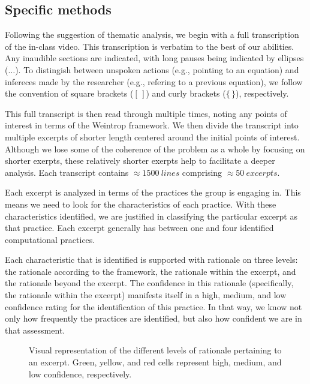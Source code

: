 \documentclass{msuphddissertation}
\begin{document}
\begin{doublespace}
\section{Specific methods}

Following the suggestion of thematic analysis, we begin with a full transcription of the in-class video.  This transcription is verbatim to the best of our abilities.  Any inaudible sections are indicated, with long pauses being indicated by ellipses ($\ldots$).  To distingish between unspoken actions (e.g., pointing to an equation) and infereces made by the researcher (e.g., refering to a previous equation), we follow the convention of square brackets ($[\,]$) and curly brackets ($\{\,\}$), respectively.

This full transcript is then read through multiple times, noting any points of interest in terms of the Weintrop framework.  We then divide the transcript into multiple excerpts of shorter length centered around the initial points of interest.  Although we lose some of the coherence of the problem as a whole by focusing on shorter exerpts, these relatively shorter exerpts help to facilitate a deeper analysis.  Each transcript contains $\approx\SI{1500}{lines}$ comprising $\approx\SI{50}{excerpts}$.

Each excerpt is analyzed in terms of the practices the group is engaging in.  This means we need to look for the characteristics of each practice. With these characteristics identified, we are justified in classifying the particular excerpt as that practice.  Each excerpt generally has between one and four identified computational practices. 

Each characteristic that is identified is supported with rationale on three levels: the rationale according to the framework, the rationale within the excerpt, and the rationale beyond the excerpt.  The confidence in this rationale (specifically, the rationale within the excerpt) manifests itself in a high, medium, and low confidence rating for the identification of this practice.  In that way, we know not only how frequently the practices are identified, but also how confident we are in that assessment.

\begin{figure}[ht]\centering
\caption{Visual representation of the different levels of rationale pertaining to an excerpt.  Green, yellow, and red cells represent high, medium, and low confidence, respectively.}\label{CH3:VariableAnalysis}
\end{figure}


\end{doublespace}
\end{document}

